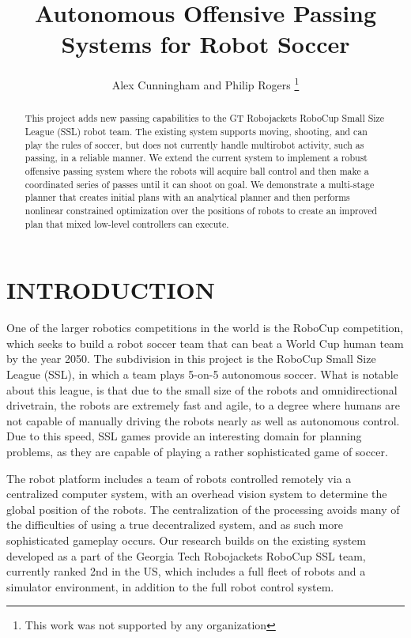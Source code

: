 \documentclass[a4paper, 10pt, conference]{ieeeconf}      %
\title{\LARGE \bf
Autonomous Offensive Passing Systems for Robot Soccer
}
\author{Alex Cunningham and Philip Rogers%
\thanks{This work was not supported by any organization}%
}
\begin{document}
\maketitle
\thispagestyle{empty}
\pagestyle{empty}


\begin{abstract}

This project adds new passing capabilities to the GT Robojackets RoboCup Small Size League (SSL) robot team. The existing system supports moving, shooting, and can play the rules of soccer, but does not currently handle multirobot activity, such as passing, in a reliable manner. We extend the current system to implement a robust offensive passing system where the robots will acquire ball control and then make a coordinated series of passes until it can shoot on goal. We demonstrate a multi-stage planner that creates initial plans with an analytical planner and then performs nonlinear constrained optimization over the positions of robots to create an improved plan that mixed low-level controllers can execute.  

\end{abstract}


\section{INTRODUCTION}
One of the larger robotics competitions in the world is the RoboCup competition, which seeks to build a robot soccer team that can beat a World Cup human team by the year 2050.  The subdivision in this project is the RoboCup Small Size League (SSL), in which a team plays 5-on-5 autonomous soccer.  What is notable about this league, is that due to the small size of the robots and omnidirectional drivetrain, the robots are extremely fast and agile, to a degree where humans are not capable of manually driving the robots nearly as well as autonomous control.  Due to this speed, SSL games provide an interesting domain for planning problems, as they are capable of playing a rather sophisticated game of soccer.  

The robot platform includes a team of robots controlled remotely via a centralized computer system, with an overhead vision system to determine the global position of the robots.  The centralization of the processing avoids many of the difficulties of using a true decentralized system, and as such more sophisticated gameplay occurs.  Our research builds on the existing system developed as a part of the Georgia Tech Robojackets RoboCup SSL team, currently ranked 2nd in the US, which includes a full fleet of robots and a simulator environment, in addition to the full robot control system.  
\end{document}
